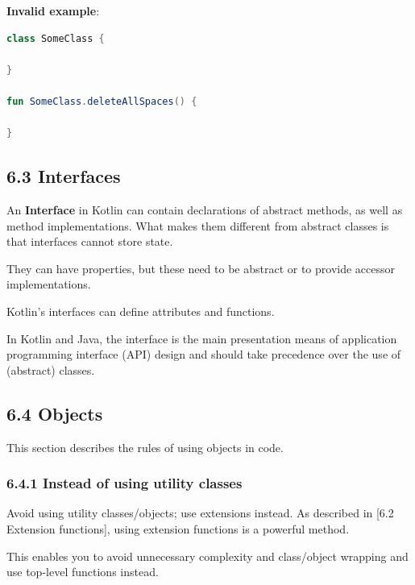 \textbf{Invalid example}:

\begin{lstlisting}[language=Kotlin]
class SomeClass {
    
}

fun SomeClass.deleteAllSpaces() {
    
}
\end{lstlisting}


\subsection*{\textbf{6.3 Interfaces}}

\label{sec:6.3}

An \textbf{Interface} in Kotlin can contain declarations of abstract methods, as well as method implementations. What makes them different from abstract classes is that interfaces cannot store state.

They can have properties, but these need to be abstract or to provide accessor implementations.



Kotlin's interfaces can define attributes and functions.

In Kotlin and Java, the interface is the main presentation means of application programming interface (API) design and should take precedence over the use of (abstract) classes.



\subsection*{\textbf{6.4 Objects}}

\label{sec:6.4}

This section describes the rules of using objects in code.

\subsubsection*{\textbf{6.4.1 Instead of using utility classes}}
\leavevmode\newline

\label{sec:6.4.1}

Avoid using utility classes/objects; use extensions instead. As described in [6.2 Extension functions], using extension functions is a powerful method.

This enables you to avoid unnecessary complexity and class/object wrapping and use top-level functions instead.



